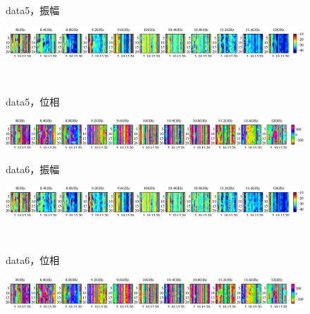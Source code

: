 ﻿\documentclass[12pt,oneside]{jsbook}
\begin{document}
\begin{figure}[bhtp]
 \begin{center}
     \begin{minipage}[c]{0.19\hsize}
      data5，振幅
  \end{minipage}
     \begin{minipage}[c]{0.79\hsize}
\includegraphics[width = \hsize ]{20150204_mine5_raw_a.eps}
  \end{minipage}
\\
     \begin{minipage}[c]{0.19\hsize}
data5，位相
  \end{minipage}
     \begin{minipage}[c]{0.8\hsize}
\includegraphics[width =\hsize ]{20150204_mine5_raw_p.eps}
  \end{minipage}
\end{center}
\end{figure}
\begin{figure}[hbtp]
 \begin{center}
     \begin{minipage}[c]{0.19\hsize}
      data6，振幅
  \end{minipage}
     \begin{minipage}[c]{0.79\hsize}
\includegraphics[width = \hsize ]{20150204_mine6_raw_a.eps}
  \end{minipage}
\\
     \begin{minipage}[c]{0.19\hsize}
data6，位相
  \end{minipage}
     \begin{minipage}[c]{0.8\hsize}
\includegraphics[width =\hsize ]{20150204_mine6_raw_p.eps}
  \end{minipage}
\end{center}
\end{figure}
\end{document}
